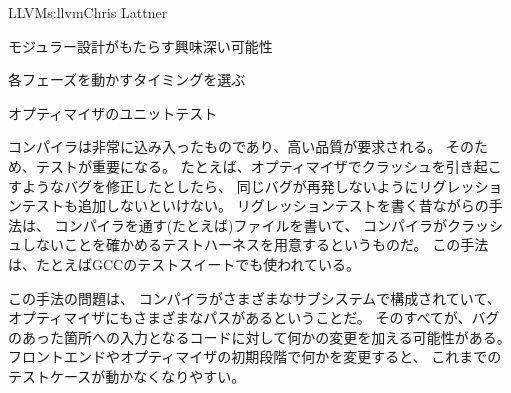 \begin{aosachapter}{LLVM}{s:llvm}{Chris Lattner}
\begin{aosasect1}{モジュラー設計がもたらす興味深い可能性}
\begin{aosasect2}{各フェーズを動かすタイミングを選ぶ}

\end{aosasect2}

\vspace{-.5cm}
\begin{aosasect2}{オプティマイザのユニットテスト}

コンパイラは非常に込み入ったものであり、高い品質が要求される。
そのため、テストが重要になる。
たとえば、オプティマイザでクラッシュを引き起こすようなバグを修正したとしたら、
同じバグが再発しないようにリグレッションテストも追加しないといけない。
リグレッションテストを書く昔ながらの手法は、
コンパイラを通す(たとえば)ファイルを書いて、
コンパイラがクラッシュしないことを確かめるテストハーネスを用意するというものだ。
この手法は、たとえばGCCのテストスイートでも使われている。

この手法の問題は、
コンパイラがさまざまなサブシステムで構成されていて、
オプティマイザにもさまざまなパスがあるということだ。
そのすべてが、バグのあった箇所への入力となるコードに対して何かの変更を加える可能性がある。
フロントエンドやオプティマイザの初期段階で何かを変更すると、
これまでのテストケースが動かなくなりやすい。


\end{aosasect2}
\end{aosasect1}
\end{aosachapter}
